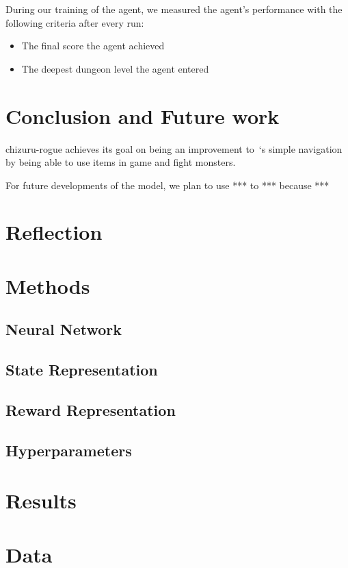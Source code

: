 \documentclass[12pt,a4paper]{article}
\begin{document}
    During our training of the agent, we measured the agent's performance with the following criteria after every run:
    \begin{itemize}
        \item The final score the agent achieved
        \item The deepest dungeon level the agent entered
    \end{itemize}

    \section{Conclusion and Future work}\label{sec:conclusion-and-future-work}

    chizuru-rogue achieves its goal on being an improvement to~\citet{asperti18}`s simple navigation by being able to use items in game and fight monsters.

    For future developments of the model, we plan to use *** to *** because ***

    \section{Reflection}\label{sec:reflection}


    \medskip

    
    

    \medskip

    \appendix
    \section{Methods}
    \subsection{Neural Network}
    \subsection{State Representation}
    \subsection{Reward Representation}
    \subsection{Hyperparameters}
    \section{Results}
    \section{Data}
\end{document}
